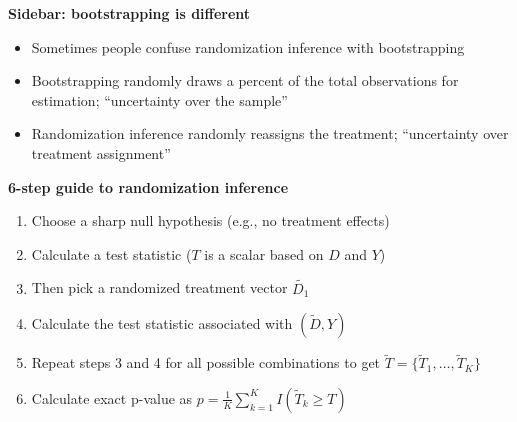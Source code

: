 \documentclass[notes=show]{beamer}
\begin{document}
\begin{frame}[plain]
\begin{center}
\textbf{Sidebar: bootstrapping is different}
\end{center}

\begin{itemize}
\item Sometimes people confuse randomization inference with bootstrapping
\item Bootstrapping randomly draws a percent of the total observations for estimation; ``uncertainty over the sample''
\item Randomization inference randomly reassigns the treatment;  ``uncertainty over treatment assignment''
\end{itemize}

\end{frame}


\begin{frame}[plain]

\begin{center}
\textbf{6-step guide to randomization inference}
\end{center}

\begin{enumerate}
\item Choose a sharp null hypothesis (e.g., no treatment effects)
\item Calculate a test statistic ($T$ is a scalar based on $D$ and $Y$)
\item Then pick a randomized treatment vector $\tilde{D_1}$
\item Calculate the test statistic associated with $(\tilde{D},Y)$
\item Repeat steps 3 and 4 for all possible combinations to get $\tilde{T} = \{\tilde{T}_1, \dots , \tilde{T}_K \}$
\item Calculate exact p-value as $p=\frac{1}{K} \sum_{k=1}^K I(\tilde{T}_k \geq T)$
\end{enumerate}
\end{frame}
\end{document}
